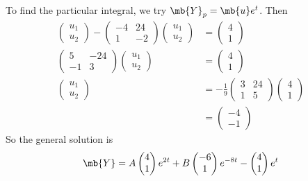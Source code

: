 \documentclass[a4paper]{article}
\begin{document}
\begin{eg}
To find the particular integral, we try $\mb{Y}_p = \mb{u}e^t$. Then
\begin{align*}
  \begin{pmatrix}
    u_1\\u_2
  \end{pmatrix} - 
  \begin{pmatrix}
    -4 & 24\\
    1 & -2
  \end{pmatrix}
  \begin{pmatrix}
    u_1\\u_2
  \end{pmatrix}&=
  \begin{pmatrix}
    4\\1
  \end{pmatrix}\\
  \begin{pmatrix}
    5 & -24\\
    -1 & 3
  \end{pmatrix}
  \begin{pmatrix}
    u_1\\u_2
  \end{pmatrix}&= 
  \begin{pmatrix}
    4\\1
  \end{pmatrix}\\
  \begin{pmatrix}
    u_1\\u_2
  \end{pmatrix} &= -\frac{1}{9}
  \begin{pmatrix}
    3 & 24\\
    1 & 5
  \end{pmatrix}
  \begin{pmatrix}
    4 \\ 1
  \end{pmatrix}\\
  &= 
  \begin{pmatrix}
    -4\\-1
  \end{pmatrix}
\end{align*}
So the general solution is
\[
\mb{Y} = A
\begin{pmatrix}
  4\\1
\end{pmatrix}e^{2t} + B
\begin{pmatrix}
  -6\\1
\end{pmatrix}e^{-8t} - 
\begin{pmatrix}
  4\\1
\end{pmatrix}e^t
\]
\end{eg}
\end{document}
